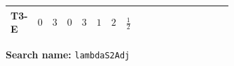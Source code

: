 \documentclass[8pt]{article}
\begin{document}
\begin{landscape}
\begin{longtable}{@{}llcccccc >{\raggedright\arraybackslash}p{0.21\linewidth} >{\raggedright\arraybackslash}p{0.21\linewidth} >{\raggedright\arraybackslash}p{0.21\linewidth}@{}}
\midrule
T3-E & $0$ & $3$ & $0$ & $3$ & $1$ & $2$ & $\frac{1}{2}$ & \scriptsize\adjustbox{max width=\linewidth}{$\begin{gathered} \frac{3 {g_2}^4}{4}\end{gathered}$} & \scriptsize\adjustbox{max width=\linewidth}{$\begin{gathered} +{g_Y}^2 \left(9 {g_2}^2-\frac{3 {\lambda_{S_2}}}{2}-12 {\lambda_{S_2}^{\rm Adj}}\right)\end{gathered}$} & \scriptsize\adjustbox{max width=\linewidth}{$\begin{gathered} +{g_2}^2 (-3 {\lambda_{S_2}}-24 {\lambda_{S_2}^{\rm Adj}})\end{gathered}$} \\
\midrule
\bottomrule
\end{longtable}
\clearpage
\noindent\textbf{Search name: }\texttt{lambdaS2Adj}\par\smallskip

\end{landscape}
\end{document}
